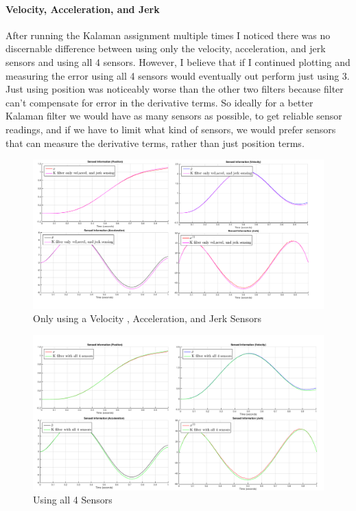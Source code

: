 \documentclass[11pt,english]{article}
\begin{document}
\paragraph{Velocity, Acceleration, and Jerk}
	After running the Kalaman assignment multiple times I noticed there was no discernable difference between using only the velocity, acceleration, and jerk sensors and using all 4 sensors. However, I believe that if I continued plotting and measuring the error  using all 4 sensors would eventually out perform just using 3. Just using position was noticeably worse than the other two filters because filter can't compensate for error in the derivative terms. So ideally for a better Kalaman filter we would have as many sensors as possible, to get reliable sensor readings, and if we have to limit what kind of sensors, we would prefer sensors that can measure the derivative terms, rather than just position terms. 
\begin{figure}[!h]
\caption{Only using a Velocity , Acceleration, and Jerk Sensors}
\includegraphics[width = \linewidth]{vaj}
\end{figure}  
 
 \begin{figure}[!h]
\caption{Using all 4 Sensors}
\includegraphics[width = \linewidth]{all4}
\end{figure}  
\end{document}
